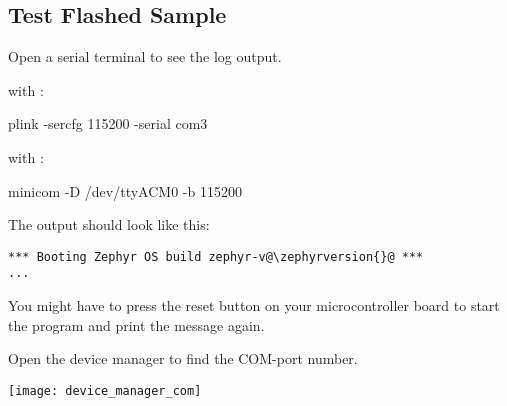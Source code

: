 \subsection{Test Flashed Sample}

Open a serial terminal to see the log output.

with :

\begin{monobox}
plink -sercfg 115200 -serial com3
\end{monobox}

with :

\begin{monobox}
minicom -D /dev/ttyACM0 -b 115200
\end{monobox}

The output should look like this:

\begin{lstlisting}
*** Booting Zephyr OS build zephyr-v@\zephyrversion{}@ ***
...
\end{lstlisting}

You might have to press the reset button on your microcontroller board to start the program and print the message again.

\begin{infobox}
  Open the device manager to find the COM-port number.
  \begin{center}
    \texttt{[image: device\_manager\_com]}
  \end{center}
\end{infobox}

